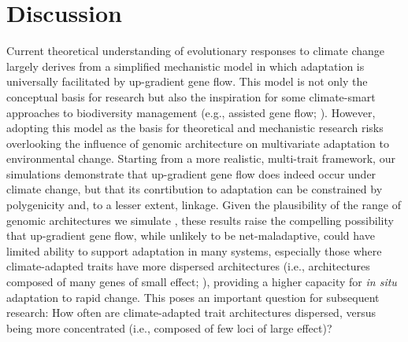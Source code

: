\documentclass[9pt,twocolumn,twoside,lineno]{pnas-new}
\begin{document}
\section*{Discussion}

Current theoretical understanding of evolutionary responses to climate change
largely derives from a simplified mechanistic model in which
adaptation is universally facilitated by up-gradient gene flow.
This model is not only the conceptual basis for research
but also the inspiration for some climate-smart
approaches to biodiversity management
(e.g., assisted gene flow; \cite{aitken_whitlock}).
However, adopting this model as the basis
for theoretical and mechanistic research
risks overlooking the influence of
genomic architecture on multivariate adaptation to environmental change.
Starting from a more realistic, multi-trait framework,
our simulations demonstrate that up-gradient gene flow does indeed
occur under climate change,
but that its conrtibution to adaptation can be constrained
by polygenicity and, to a lesser extent, linkage.
Given the plausibility of the range of genomic architectures we simulate
\cite{barghi_polygenic,boyle,rockman,savolainen,sella,bomblies},
these results raise the compelling
possibility that up-gradient gene flow, while unlikely
to be net-maladaptive, could have limited ability to
support adaptation in many systems,
especially those where climate-adapted traits
have more dispersed architectures
(i.e., architectures composed of many genes of small effect; \cite{yeaman_review}),
providing a higher capacity for \textit{in situ} adaptation to rapid change.
This poses an important question for subsequent research:
How often are climate-adapted trait architectures dispersed,
versus being more concentrated (i.e., composed of
few loci of large effect)?
\end{document}
